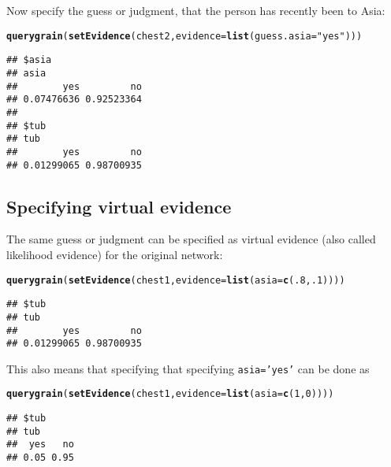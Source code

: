 \documentclass[10pt]{article}\usepackage[]{graphicx}\usepackage[]{color}
\makeatletter
\newcommand{\hlnum}[1]{\textcolor[rgb]{0.686,0.059,0.569}{#1}}%
\newcommand{\hlstr}[1]{\textcolor[rgb]{0.192,0.494,0.8}{#1}}%
\newcommand{\hlstd}[1]{\textcolor[rgb]{0.345,0.345,0.345}{#1}}%
\newcommand{\hlkwc}[1]{\textcolor[rgb]{0.333,0.667,0.333}{#1}}%
\newcommand{\hlkwd}[1]{\textcolor[rgb]{0.737,0.353,0.396}{\textbf{#1}}}%
\newenvironment{kframe}{%
 \def\at@end@of@kframe{}%
 \ifinner\ifhmode%
  \def\at@end@of@kframe{\end{minipage}}%
  \begin{minipage}{\columnwidth}%
 \fi\fi%
 \def\FrameCommand##1{\hskip\@totalleftmargin \hskip-\fboxsep
 \colorbox{shadecolor}{##1}\hskip-\fboxsep
     \hskip-\linewidth \hskip-\@totalleftmargin \hskip\columnwidth}%
 \MakeFramed {\advance\hsize-\width
   \@totalleftmargin\z@ \linewidth\hsize
   \@setminipage}}%
 {\par\unskip\endMakeFramed%
 \at@end@of@kframe}
\newenvironment{knitrout}{}{} %
\def\code#1{{\texttt{#1}}}
\makeatother
\begin{document}
Now specify the guess or judgment, that the person has recently been
to Asia:

\begin{knitrout}
\color{fgcolor}\begin{kframe}
\begin{alltt}
\hlkwd{querygrain}\hlstd{(}\hlkwd{setEvidence}\hlstd{(chest2,} \hlkwc{evidence}\hlstd{=}\hlkwd{list}\hlstd{(}\hlkwc{guess.asia}\hlstd{=}\hlstr{"yes"}\hlstd{)))}
\end{alltt}
\begin{verbatim}
## $asia
## asia
##        yes         no 
## 0.07476636 0.92523364 
## 
## $tub
## tub
##        yes         no 
## 0.01299065 0.98700935
\end{verbatim}
\end{kframe}
\end{knitrout}

\subsection{Specifying virtual evidence}
\label{sec:spec-virt-evid}

The same guess or judgment can be specified as virtual evidence
(also called likelihood evidence) for the original network:

\begin{knitrout}
\color{fgcolor}\begin{kframe}
\begin{alltt}
\hlkwd{querygrain}\hlstd{(}\hlkwd{setEvidence}\hlstd{(chest1,} \hlkwc{evidence}\hlstd{=}\hlkwd{list}\hlstd{(}\hlkwc{asia}\hlstd{=}\hlkwd{c}\hlstd{(}\hlnum{.8}\hlstd{,} \hlnum{.1}\hlstd{))))}
\end{alltt}
\begin{verbatim}
## $tub
## tub
##        yes         no 
## 0.01299065 0.98700935
\end{verbatim}
\end{kframe}
\end{knitrout}

This also means that specifying that specifying \code{asia='yes'} can
be done as
\begin{knitrout}
\color{fgcolor}\begin{kframe}
\begin{alltt}
\hlkwd{querygrain}\hlstd{(}\hlkwd{setEvidence}\hlstd{(chest1,} \hlkwc{evidence}\hlstd{=}\hlkwd{list}\hlstd{(}\hlkwc{asia}\hlstd{=}\hlkwd{c}\hlstd{(}\hlnum{1}\hlstd{,} \hlnum{0}\hlstd{))))}
\end{alltt}
\begin{verbatim}
## $tub
## tub
##  yes   no 
## 0.05 0.95
\end{verbatim}
\end{kframe}
\end{knitrout}
\end{document}

